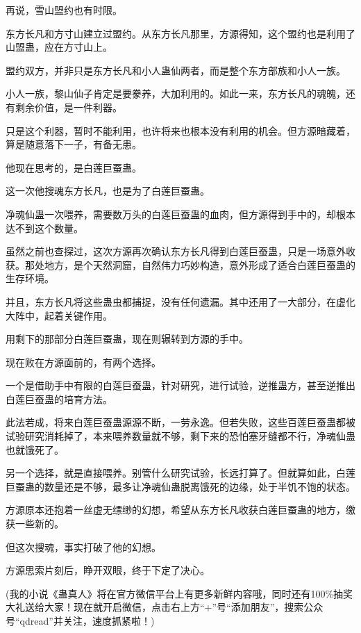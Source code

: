 \begin{this_body}
再说，雪山盟约也有时限。

东方长凡和方寸山建立过盟约。从东方长凡那里，方源得知，这个盟约也是利用了山盟蛊，应在方寸山上。

盟约双方，并非只是东方长凡和小人蛊仙两者，而是整个东方部族和小人一族。

小人一族，黎山仙子肯定是要豢养，大加利用的。如此一来，东方长凡的魂魄，还有剩余价值，是一件利器。

只是这个利器，暂时不能利用，也许将来也根本没有利用的机会。但方源暗藏着，算是随意落下一子，有备无患。

他现在思考的，是白莲巨蚕蛊。

这一次他搜魂东方长凡，也是为了白莲巨蚕蛊。

净魂仙蛊一次喂养，需要数万头的白莲巨蚕蛊的血肉，但方源得到手中的，却根本达不到这个数量。

虽然之前也查探过，这次方源再次确认东方长凡得到白莲巨蚕蛊，只是一场意外收获。那处地方，是个天然洞窟，自然伟力巧妙构造，意外形成了适合白莲巨蚕蛊的生存环境。

并且，东方长凡将这些蛊虫都捕捉，没有任何遗漏。其中还用了一大部分，在虚化大阵中，起着关键作用。

用剩下的那部分白莲巨蚕蛊，现在则辗转到方源的手中。

现在败在方源面前的，有两个选择。

一个是借助手中有限的白莲巨蚕蛊，针对研究，进行试验，逆推蛊方，甚至逆推出白莲巨蚕蛊的培育方法。

此法若成，将来白莲巨蚕蛊源源不断，一劳永逸。但若失败，这些百莲巨蚕蛊都被试验研究消耗掉了，本来喂养数量就不够，剩下来的恐怕塞牙缝都不行，净魂仙蛊也就饿死了。

另一个选择，就是直接喂养。别管什么研究试验，长远打算了。但就算如此，白莲巨蚕蛊的数量还是不够，最多让净魂仙蛊脱离饿死的边缘，处于半饥不饱的状态。

方源原本还抱着一丝虚无缥缈的幻想，希望从东方长凡收获白莲巨蚕蛊的地方，缴获一些新的。

但这次搜魂，事实打破了他的幻想。

方源思索片刻后，睁开双眼，终于下定了决心。

(我的小说《蛊真人》将在官方微信平台上有更多新鲜内容哦，同时还有100\%抽奖大礼送给大家！现在就开启微信，点击右上方“+”号“添加朋友”，搜索公众号“qdread”并关注，速度抓紧啦！)

\end{this_body}

